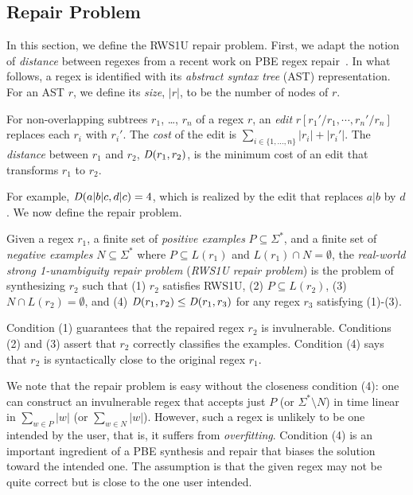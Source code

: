 \documentclass[conference]{IEEEtran}
\newcommand{\distfunc}{{\it D}}
\newcommand{\ltp}{RWS1U}
\begin{document}
\subsection{Repair Problem}
\label{subsec:repairproblem}
In this section, we define the \ltp{} repair problem.
First, we adapt the notion of {\em distance} between regexes from a recent work on
PBE regex repair~\cite{10.1145/3360565}.  In what follows, a regex is identified with its {\em abstract syntax tree} (AST) representation.  For an AST $r$, we define its {\em size}, $|r|$, to be the number of nodes of $r$.
\begin{definition}[Distance]
\label{def:dist}
\normalfont
For non-overlapping subtrees $r_1$, \dots, $r_n$ of a regex $r$, an {\it edit} $r[r_1'/r_1, \cdots, r_n'/r_n]$ replaces each $r_i$ with $r_i'$.
The {\em cost} of the edit is $\sum_{i \in \{1,\dots,n\}} |r_i| + |r_i'|$. The {\em distance} between  $r_1$ and $r_2$, $\distfunc{}(r_1,r_2)$, is the minimum cost of an edit that transforms $r_1$ to $r_2$.
\end{definition}
For example, $\distfunc{}(a|b|c,d|c) = 4$, which is realized by the edit that replaces $a|b$ by $d$.
We now define the repair problem.
\begin{definition}[\ltp{} Repair Problem]
\label{def:ltprepair}
\normalfont
Given a regex $r_1$, a finite set of {\em positive examples} $P \subseteq \Sigma^{*}$, and a finite set of {\em negative examples} $N \subseteq \Sigma^{*}$ where $P \subseteq L(r_1)$ and $L(r_1) \cap N = \emptyset$, the {\em real-world strong 1-unambiguity repair problem} ({\em \ltp{} repair problem}) is the problem of synthesizing $r_2$ such that (1) $r_2$ satisfies \ltp{}, (2) $P \subseteq L(r_2)$, (3) $N \cap L(r_2) = \emptyset$, and (4) $\distfunc{}(r_1,r_2) \leq \distfunc{}(r_1,r_3)$ for any regex $r_3$ satisfying (1)-(3).
\end{definition}
Condition (1) guarantees that the repaired regex $r_2$ is invulnerable.  Conditions (2) and (3) assert that $r_2$ correctly classifies the examples.  Condition (4) says that $r_2$ is syntactically close to the original regex $r_1$.   

We note that the repair problem is easy without the closeness condition (4): one can construct an invulnerable regex that accepts just $P$ (or $\Sigma^*\setminus N$) in time linear in $\sum_{w \in P} |w|$ (or $\sum_{w \in N} |w|$).  However, such a regex is unlikely to be one intended by the user, that is, it suffers from {\em overfitting}.  Condition (4) is an important ingredient of a PBE synthesis and repair that biases the solution toward the intended one.  The assumption is that the given regex may not be quite correct but is close to the one user intended.
\end{document}
